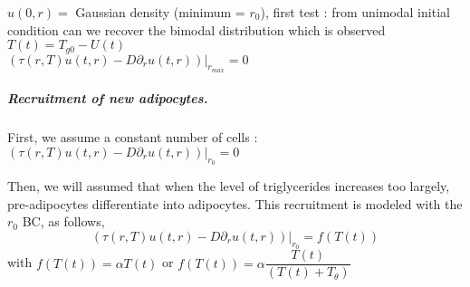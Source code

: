 \documentclass[11pt,a4paper]{article}
\begin{document}
$u(0, r) =$ Gaussian density (minimum = $r_{0}$), first test : from unimodal initial condition can we recover the bimodal distribution which is observed \\
$T(t) = T_{g0} - U(t)$\\
$(\tau(r, T) u(t,r) - D \partial_r u(t,r)) |_{r_{max}} = 0$

\subparagraph{Recruitment of new adipocytes.} 

First, we assume a constant number of cells : $(\tau(r, T) u(t,r) - D \partial_r u(t,r)) |_{r_{0}}= 0$


Then, we will assumed that when the level of triglycerides increases too largely, pre-adipocytes differentiate into adipocytes. This recruitment is modeled with the $r_0$ BC, as follows,
$$(\tau(r, T) u(t,r) - D \partial_r u(t,r)) |_{r_{0}}= f(T(t))$$ with $f(T(t)) = \alpha T(t)$ or $f(T(t)) = \alpha \dfrac{T(t)}{(T(t)+T_{\theta})}$ 
\end{document}
